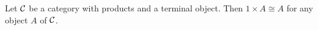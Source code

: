 \begin{proposition}
  Let \(\mathcal C\) be a category with products and a terminal object.
  Then \(1 \times A \cong A\) for any object \(A\) of \(\mathcal C\).
\end{proposition}


